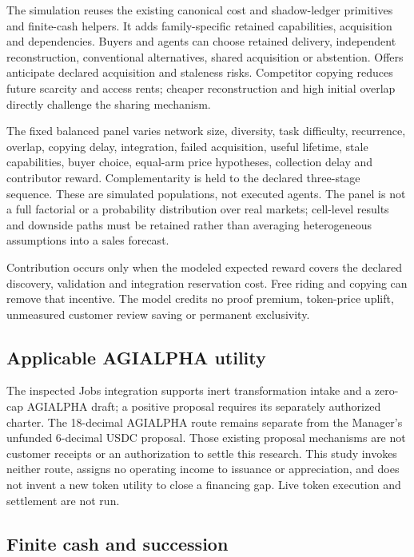 \documentclass[11pt,letterpaper]{article}
\begin{document}
The simulation reuses the existing canonical cost and shadow-ledger primitives and finite-cash helpers. It adds family-specific retained capabilities, acquisition and dependencies. Buyers and agents can choose retained delivery, independent reconstruction, conventional alternatives, shared acquisition or abstention. Offers anticipate declared acquisition and staleness risks. Competitor copying reduces future scarcity and access rents; cheaper reconstruction and high initial overlap directly challenge the sharing mechanism.

The fixed balanced panel varies network size, diversity, task difficulty, recurrence, overlap, copying delay, integration, failed acquisition, useful lifetime, stale capabilities, buyer choice, equal-arm price hypotheses, collection delay and contributor reward. Complementarity is held to the declared three-stage sequence. These are simulated populations, not executed agents. The panel is not a full factorial or a probability distribution over real markets; cell-level results and downside paths must be retained rather than averaging heterogeneous assumptions into a sales forecast.

Contribution occurs only when the modeled expected reward covers the declared discovery, validation and integration reservation cost. Free riding and copying can remove that incentive. The model credits no proof premium, token-price uplift, unmeasured customer review saving or permanent exclusivity.

\subsection{Applicable AGIALPHA utility}

The inspected Jobs integration supports inert transformation intake and a zero-cap AGIALPHA draft; a positive proposal requires its separately authorized charter. The 18-decimal AGIALPHA route remains separate from the Manager's unfunded 6-decimal USDC proposal. Those existing proposal mechanisms are not customer receipts or an authorization to settle this research. This study invokes neither route, assigns no operating income to issuance or appreciation, and does not invent a new token utility to close a financing gap. Live token execution and settlement are not run.

\subsection{Finite cash and succession}
\end{document}
